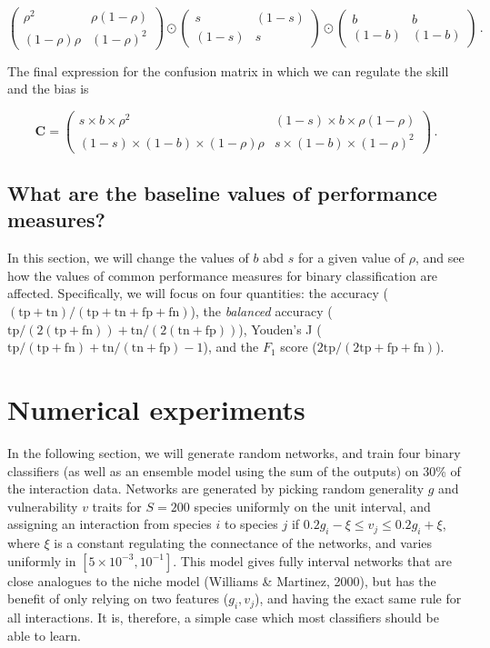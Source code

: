 \documentclass[11pt]{article}
\begin{document}
\[
\begin{pmatrix}
    \rho^2 & \rho (1-\rho) \\
    (1-\rho) \rho & (1-\rho)^2
\end{pmatrix} \odot \begin{pmatrix}
    s & (1-s) \\
    (1-s) & s
\end{pmatrix} \odot \begin{pmatrix}
    b & b \\
    (1-b) & (1-b)
\end{pmatrix}\,.
\]

The final expression for the confusion matrix in which we can regulate
the skill and the bias is

\[
\mathbf{C} = \begin{pmatrix}
    s\times b\times \rho^2 & (1-s)\times b\times \rho (1-\rho) \\
    (1-s)\times (1-b)\times (1-\rho) \rho & s\times (1-b)\times (1-\rho)^2
\end{pmatrix} \,.
\]

\hypertarget{what-are-the-baseline-values-of-performance-measures}{%
\subsection{What are the baseline values of performance
measures?}\label{what-are-the-baseline-values-of-performance-measures}}

In this section, we will change the values of \(b\) abd \(s\) for a
given value of \(\rho\), and see how the values of common performance
measures for binary classification are affected. Specifically, we will
focus on four quantities: the accuracy
(\((\text{tp}+\text{tn})/(\text{tp}+\text{tn}+\text{fp}+\text{fn})\)),
the \emph{balanced} accuracy
(\(\text{tp}/(2(\text{tp}+\text{fn}))+\text{tn}/(2(\text{tn}+\text{fp}))\)),
Youden's J
(\(\text{tp}/(\text{tp}+\text{fn})+\text{tn}/(\text{tn}+\text{fp})-1\)),
and the \(F_1\) score (\(2\text{tp}/(2\text{tp}+\text{fp}+\text{fn})\)).

\hypertarget{numerical-experiments}{%
\section{Numerical experiments}\label{numerical-experiments}}

In the following section, we will generate random networks, and train
four binary classifiers (as well as an ensemble model using the sum of
the outputs) on 30\% of the interaction data. Networks are generated by
picking random generality \(g\) and vulnerability \(v\) traits for
\(S = 200\) species uniformly on the unit interval, and assigning an
interaction from species \(i\) to species \(j\) if
\(0.2g_i-\xi \le v_j \le 0.2g_i+\xi\), where \(\xi\) is a constant
regulating the connectance of the networks, and varies uniformly in
\([5\times 10^{-3}, 10^{-1}]\). This model gives fully interval networks
that are close analogues to the niche model (Williams \& Martinez,
2000), but has the benefit of only relying on two features
(\(g_i, v_j\)), and having the exact same rule for all interactions. It
is, therefore, a simple case which most classifiers should be able to
learn.
\end{document}
